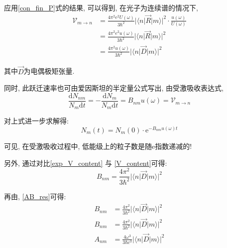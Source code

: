 \documentclass[a4paper, 11pt]{article}
\begin{document}
\begin{spacing}{1.2}
          应用\eqref{con_fin_P}式的结果, 可以得到, 在光子为连续谱的情况下, 
          \begin{equation}
            \label{V_content}
            \begin{aligned}
                \mathcal{V}_{m\to{}n} &= \frac{4\pi^2e^2U(\omega)}{3\hbar^2}
                                        |\langle{}n|\vec{R}|m\rangle|^2
                                        \cdot\frac{u(\omega)}{U(\omega)}\\
                                      &= \frac{4\pi^2e^2u(\omega)}{3\hbar^2}
                                        |\langle{}n|\vec{R}|m\rangle|^2\\
                                      &= \frac{4\pi^2u(\omega)}{3\hbar^2}
                                      |\langle{}n|\vec{D}|m\rangle|^2
            \end{aligned}      
          \end{equation}

          其中$\vec{D}$为电偶极矩张量.

          同时, 此跃迁速率也可由爱因斯坦的半定量公式写出, 由受激吸收表达式,         
          \begin{equation}
            \label{exp_V_content}
            \dfrac{\mathrm{d}N_{nm}}{N_m\mathrm{d}t} = -\dfrac{\mathrm{d}N_{m}}{N_m\mathrm{d}t}
            = B_{nm}u(\omega) = \mathcal{V}_{m\to{}n}
          \end{equation}
          
          对上式进一步求解得:
          \begin{equation}
            N_m(t) = N_m(0)\cdot\mathrm{e}^{-B_{nm}u(\omega)t}
          \end{equation}
          
          可见, 在受激吸收过程中, 低能级上的粒子数是随e指数递减的!
        
          另外, 通过对比\eqref{exp_V_content} 与 \eqref{V_content}可得:
          \begin{equation} 
            B_{nm} = \frac{4\pi^2}{3\hbar^2}|\langle{}n|\vec{D}|m\rangle|^2
          \end{equation}

          再由, \eqref{AB_res}可得:
          \begin{subequations}
            \label{fin_AB}
            \begin{align}
              B_{nm} &= \frac{4\pi^2}{3\hbar^2}|\langle{}n|\vec{D}|m\rangle|^2\\
              B_{nm} &= \frac{4\pi^2}{3\hbar^2}|\langle{}n|\vec{D}|m\rangle|^2\\
              A_{nm} &= \frac{4\omega^3}{3\hbar{}c^3}|\langle{}n|\vec{D}|m\rangle|^2
            \end{align}
          \end{subequations}
          

\end{spacing}
\end{document}
